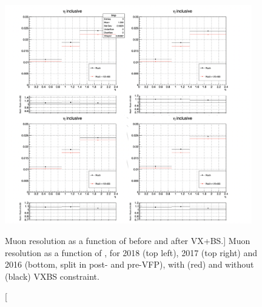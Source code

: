 \begin{figure}[!htbp]
\begin{center}
	\includegraphics[width=0.96\textwidth]{figures/higgsmassmeas/vxbs/vxbs_muon_pTresol_vs_eta.png}
    \caption
    [Muon \pT resolution as a function of \pT before and after VX+BS.]
    {Muon \pT resolution as a function of \abseta, for 2018 (top left), 2017 (top right) 
and 2016 (bottom, split in post- and pre-VFP), with (red) and without (black) VXBS constraint.} %
\label{fig:Resolution_eta}
\end{center}
\end{figure}

